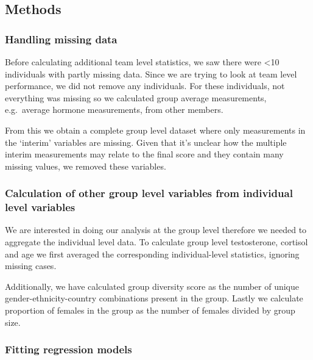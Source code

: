 \documentclass[]{article}
\begin{document}
\hypertarget{methods}{%
\subsection{Methods}\label{methods}}

\hypertarget{handling-missing-data}{%
\subsubsection{Handling missing data}\label{handling-missing-data}}

Before calculating additional team level statistics, we saw there were
\textless{}10 individuals with partly missing data. Since we are trying
to look at team level performance, we did not remove any individuals.
For these individuals, not everything was missing so we calculated group
average measurements, e.g.~average hormone measurements, from other
members.

From this we obtain a complete group level dataset where only
measurements in the `interim' variables are missing. Given that it's
unclear how the multiple interim measurements may relate to the final
score and they contain many missing values, we removed these variables.

\hypertarget{calculation-of-other-group-level-variables-from-individual-level-variables}{%
\subsubsection{Calculation of other group level variables from
individual level
variables}\label{calculation-of-other-group-level-variables-from-individual-level-variables}}

We are interested in doing our analysis at the group level therefore we
needed to aggregate the individual level data. To calculate group level
testosterone, cortisol and age we first averaged the corresponding
individual-level statistics, ignoring missing cases.

Additionally, we have calculated group diversity score as the number of
unique gender-ethnicity-country combinations present in the group.
Lastly we calculate proportion of females in the group as the number of
females divided by group size.

\hypertarget{fitting-regression-models}{%
\subsubsection{Fitting regression
models}\label{fitting-regression-models}}
\end{document}
